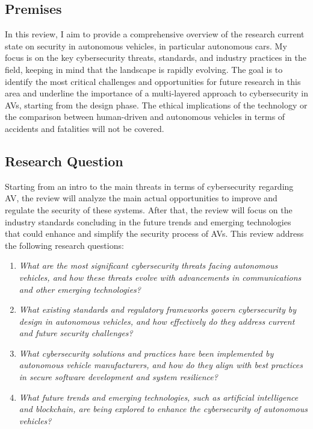 \subsection{Premises}\label{subsec:premises}

In this review,
I aim to provide a comprehensive overview of the research current state on security in autonomous vehicles,
in particular autonomous cars.
My focus is on the key cybersecurity threats, standards, and industry practices in the field,
keeping in mind that the landscape is rapidly evolving.
The goal is to identify the most critical challenges and opportunities for future research in this area
and underline the importance of a multi-layered approach to cybersecurity in AVs, starting from the design phase.
The ethical implications of the technology or the comparison between human-driven and autonomous vehicles in terms of accidents and fatalities will not be covered.

\subsection{Research Question}\label{subsec:research-question}

Starting from an intro to the main threats in terms of cybersecurity regarding AV, the review will analyze the main actual opportunities to improve and regulate the security of these systems.
After that, the review will focus on the industry standards concluding in the future trends and emerging technologies that could enhance and simplify the security process of AVs.
This review address the following research questions:

\begin{enumerate}
    \item \textit{What are the most significant cybersecurity threats facing autonomous vehicles, and how these threats evolve with advancements in communications and other emerging technologies?}
    \item \textit{What existing standards and regulatory frameworks govern cybersecurity by design in autonomous vehicles, and how effectively do they address current and future security challenges?}
    \item \textit{What cybersecurity solutions and practices have been implemented by autonomous vehicle manufacturers, and how do they align with best practices in secure software development and system resilience?}
    \item \textit{What future trends and emerging technologies, such as artificial intelligence and blockchain, are being explored to enhance the cybersecurity of autonomous vehicles?}
\end{enumerate}

